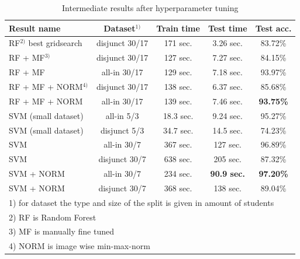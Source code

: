 \documentclass[conference]{IEEEtran}
\begin{document}
\begin{table}[hb!]
    \caption{Intermediate results after hyperparameter tuning}
    \begin{center}
    \setlength{\tabcolsep}{3pt}
    \begin{tabular}{|l|c|c|c|c|}
        \hline
        \textbf{Result name} & \textbf{Dataset$^{1)}$} & \textbf{Train time} & \textbf{Test time} & \textbf{Test acc.} \\
        \hline
        RF$^{2)}$ best gridsearch & disjunct 30/17 & 171 sec. & 3.26 sec. & 83.72\% \\
        \hline
        RF + MF$^{3)}$ & disjunct 30/17 & 127 sec. & 7.27 sec. & 84.15\% \\
        \hline
        RF + MF & all-in 30/17 & 129 sec. & 7.18 sec. & 93.97\% \\
        \hline
        RF + MF + NORM$^{4)}$ & disjunct 30/17 & 138 sec. & 6.37 sec. & 85.68\% \\
        \hline
        RF + MF + NORM & all-in 30/17 & 139 sec. & 7.46 sec. & \textbf{93.75\%} \\
        \hline
        SVM (small dataset) & all-in 5/3 & 18.3 sec. & 9.24 sec. & 95.27\% \\
        \hline
        SVM (small dataset) & disjunct 5/3 & 34.7 sec. & 14.5 sec. & 74.23\% \\
        \hline
        SVM  & all-in 30/7 & 367 sec. & 127 sec. & 96.89\% \\
        \hline
        SVM  & disjunct 30/7 & 638 sec. & 205 sec. & 87.32\% \\
        \hline
        SVM + NORM & all-in 30/7 & 234 sec. & \textbf{90.9 sec.} & \textbf{97.20\%} \\
        \hline
        SVM + NORM & disjunct 30/7 & 368 sec. & 138 sec. & 89.04\% \\
        \hline

        \multicolumn{5}{l}{1) for dataset the type and size of the split is given in amount of students } \\
        \multicolumn{5}{l}{2) RF is Random Forest } \\
        \multicolumn{5}{l}{3) MF is manually fine tuned } \\
        \multicolumn{5}{l}{4) NORM is image wise min-max-norm } \\
    \end{tabular}
    \label{table:timeIntermediateResults}
    \end{center}
\end{table}
\end{document}
